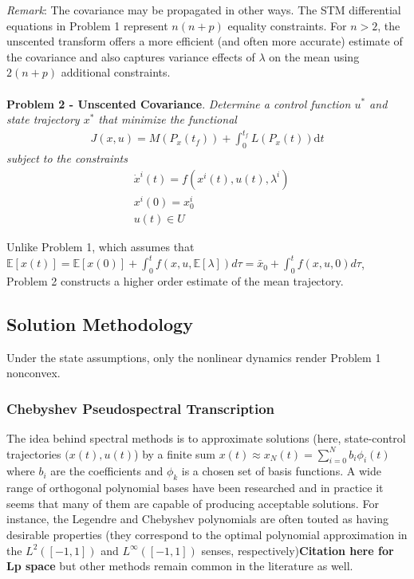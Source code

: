 \documentclass[10pt,a4paper]{article}
\begin{document}
	\textit{Remark}: The covariance may be propagated in other ways. The STM differential equations in Problem 1 represent $n(n+p)$ equality constraints. For $n>2$, the unscented transform \cite{UT,UKF1} offers a more efficient (and often more accurate) estimate of the covariance and also captures variance effects of $\lambda$ on the mean using $2(n+p)$ additional constraints.
	\\\\
	\textbf{Problem 2 - Unscented Covariance}. \textit{Determine a control function $ u^* $ and state trajectory $ x^* $ that minimize the functional}
		\begin{align}
		J(x,u) = M(P_x(t_f)) + \int_{0}^{t_f}L(P_x(t))\mathrm{d}t
		\end{align}
		\textit{	subject to the constraints }
		\begin{align}
		&\dot{x}^i(t) = f(x^i(t),u(t),\lambda^i) \\
		&x^i(0) = x^i_0 \\
		&u(t) \in U
		\end{align}
		
	Unlike Problem 1, which assumes that $\mathbb{E}[x(t)] = \mathbb{E}[x(0)] + \int_{0}^{t} f(x,u,\mathbb{E}[\lambda]) d\tau = \bar{x}_0 + \int_{0}^{t} f(x,u,0) d\tau$, Problem 2 constructs a higher order estimate of the mean trajectory.
	
	
	
	\subsection{Solution Methodology}
	Under the state assumptions, only the nonlinear dynamics render Problem 1 nonconvex.
	
	
	

	
	\subsubsection{Chebyshev Pseudospectral Transcription}
	The idea behind spectral methods is to approximate solutions (here, state-control trajectories $ (x(t),u(t) $) by a finite sum $x(t) \approx x_N(t) = \sum_{i=0}^{N}b_i\phi_i(t)$ where $b_i$ are the coefficients and $ {\phi_k} $ is a chosen set of basis functions. A wide range of orthogonal polynomial bases have been researched \cite{ChebyPS,LegendrePS,RadauPS,GPOPS} and in practice it seems that many of them are capable of producing acceptable solutions. For instance, the Legendre and Chebyshev polynomials are often touted as having desirable properties (they correspond to the optimal polynomial approximation in the $L^2([-1,1])$ and $L^\infty([-1,1])$ senses, respectively)\textbf{Citation here for Lp space} but other methods remain common in the literature as well.
	
\end{document}
